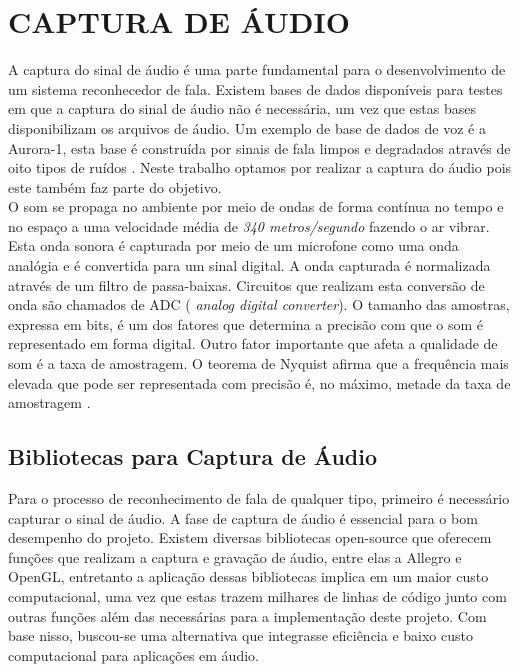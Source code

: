\chapter{CAPTURA DE ÁUDIO}
\label{chap:cap_audio}
\thispagestyle{plain}
\quad A captura do sinal de áudio é uma parte fundamental para o desenvolvimento de um sistema reconhecedor de fala. Existem bases de dados disponíveis para testes em que a captura
do sinal de áudio não é necessária, um vez que estas bases disponibilizam os arquivos de áudio. Um exemplo de base de dados de voz é a Aurora-1, esta base é construída por sinais de fala   limpos e degradados através de oito tipos de ruídos \cite{aurora}. Neste trabalho optamos por realizar a captura do áudio pois este também faz parte do objetivo.\\ 
O som se propaga no ambiente por meio de ondas de forma contínua no tempo e no espaço a uma velocidade média de \textit{340 metros/segundo} fazendo o ar vibrar. Esta onda sonora  é capturada por meio de um microfone como uma onda analógia e  é convertida para um sinal digital. A onda capturada é normalizada através de um filtro de passa-baixas. Circuitos que realizam esta conversão de onda são chamados de  ADC (\textit{ analog digital converter}). O tamanho das amostras, expressa em bits, é um dos fatores que determina a precisão com que o som é representado em forma digital. Outro fator importante que afeta a qualidade de som é a taxa de amostragem. O teorema de Nyquist  afirma que a frequência mais elevada que pode ser representada com precisão é, no máximo, metade da taxa de amostragem \cite{nyqui}.

\section{Bibliotecas para Captura de Áudio}
\quad Para o processo de reconhecimento de fala de qualquer tipo, primeiro é necessário capturar o sinal de áudio. A fase de captura de áudio é essencial para o bom desempenho do projeto. Existem diversas bibliotecas open-source que oferecem funções que realizam a captura e gravação de áudio, entre elas a Allegro e OpenGL, entretanto a aplicação dessas bibliotecas implica em um maior custo computacional, uma vez que estas trazem milhares de linhas de código junto com outras funções além das necessárias para a implementação deste projeto. Com base nisso, buscou-se uma alternativa que integrasse eficiência e baixo custo computacional para aplicações em áudio. 
 
